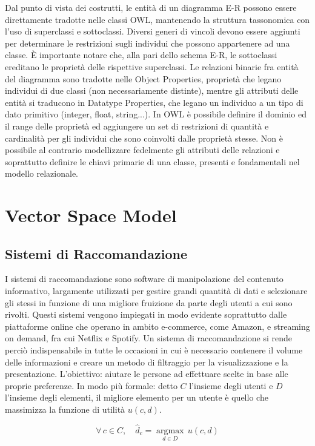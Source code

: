\documentclass[Lau,binding=0.6cm,noexaminfo,oneside]{sapthesis}
\newcommand{\argmax}{\mathop{\mathrm{argmax}}\limits}
\begin{document}
Dal punto di vista dei costrutti, le entità di un diagramma E-R possono essere direttamente tradotte nelle classi OWL, mantenendo la struttura tassonomica con l'uso di superclassi e sottoclassi. Diversi generi di vincoli devono essere aggiunti per determinare le restrizioni sugli individui che possono appartenere ad una classe. \MakeUppercase{è} importante notare che, alla pari dello schema E-R, le sottoclassi ereditano le proprietà delle rispettive superclassi.
Le relazioni binarie fra entità del diagramma sono tradotte nelle Object Properties, proprietà che legano individui di due classi (non necessariamente distinte), mentre gli attributi delle entità si traducono in Datatype Properties, che legano un individuo a un tipo di dato primitivo (integer, float, string...). In OWL è possibile definire il dominio ed il range delle proprietà ed aggiungere un set di restrizioni di quantità e cardinalità per gli individui che sono coinvolti dalle proprietà stesse. Non è possibile al contrario modellizzare fedelmente gli attributi delle relazioni e soprattutto definire le chiavi primarie di una classe, presenti e fondamentali nel modello relazionale.\medskip

\chapter{Vector Space Model}
\section{Sistemi di Raccomandazione}

I sistemi di raccomandazione sono software di manipolazione del contenuto informativo, largamente utilizzati per gestire grandi quantità di dati e selezionare gli stessi in funzione di una migliore fruizione da parte degli utenti a cui sono rivolti. Questi sistemi vengono impiegati in modo evidente soprattutto dalle piattaforme online che operano in ambito e-commerce, come Amazon, e streaming on demand, fra cui Netflix e Spotify. Un sistema di raccomandazione si rende perciò indispensabile in tutte le occasioni in cui è necessario contenere il volume delle informazioni e creare un metodo di filtraggio per la visualizzazione e la presentazione. L'obiettivo: aiutare le persone ad effettuare scelte in base alle proprie preferenze. In modo più formale: detto $C$ l'insieme degli utenti e $D$ l'insieme degli elementi, il migliore elemento per un utente è quello che massimizza la funzione di utilità $u(c,d)$.

\[
\forall \, c \in C, \quad \hat{d}_c = \argmax_{d \in D} \, u(c, d)
\]
\end{document}
